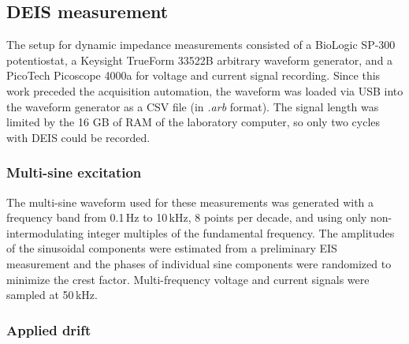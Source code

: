 \subsection{DEIS measurement}

The setup for dynamic impedance measurements consisted of a BioLogic SP-300 potentiostat, a Keysight TrueForm 33522B arbitrary waveform generator, and a PicoTech Picoscope 4000a for voltage and current signal recording.
Since this work preceded the acquisition automation, the waveform was loaded via USB into the waveform generator as a CSV file (in \emph{.arb} format). The signal length was limited by the 16 GB of RAM of the laboratory computer, so only two cycles with DEIS could be recorded.


\subsubsection{Multi-sine excitation}

The multi-sine waveform used for these measurements was generated with a frequency band from 0.1\,Hz to 10\,kHz, 8 points per decade, and using only non-intermodulating integer multiples of the fundamental frequency. The amplitudes of the sinusoidal components were estimated from a preliminary EIS measurement and the phases of individual sine components were randomized to minimize the crest factor. 
Multi-frequency voltage and current signals were sampled at 50\,kHz. 

\subsubsection{Applied drift}

